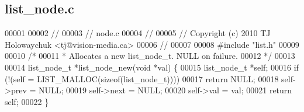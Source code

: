 \subsection{list\+\_\+node.\+c}
\label{list__node_8c_source}

\begin{DoxyCode}
00001 
00002 \textcolor{comment}{//}
00003 \textcolor{comment}{// node.c}
00004 \textcolor{comment}{//}
00005 \textcolor{comment}{// Copyright (c) 2010 TJ Holowaychuk <tj@vision-media.ca>}
00006 \textcolor{comment}{//}
00007 
00008 \textcolor{preprocessor}{#include "list.h"}
00009 
00010 \textcolor{comment}{/*}
00011 \textcolor{comment}{ * Allocates a new list\_node\_t. NULL on failure.}
00012 \textcolor{comment}{ */}
00013 
00014 list_node_t *list_node_new(\textcolor{keywordtype}{void} *val) \{
00015   list_node_t *\textcolor{keyword}{self};
00016   \textcolor{keywordflow}{if} (!(\textcolor{keyword}{self} = LIST_MALLOC(\textcolor{keyword}{sizeof}(list_node_t))))
00017     \textcolor{keywordflow}{return} NULL;
00018   \textcolor{keyword}{self}->prev = NULL;
00019   \textcolor{keyword}{self}->next = NULL;
00020   \textcolor{keyword}{self}->val = val;
00021   \textcolor{keywordflow}{return} \textcolor{keyword}{self};
00022 \}
\end{DoxyCode}
